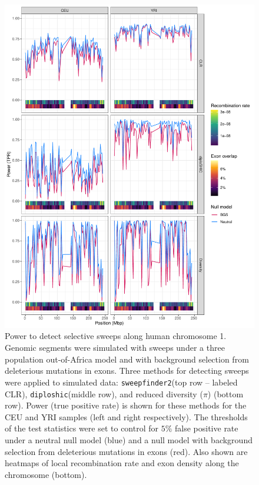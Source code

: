 \documentclass[hidelinks]{article}
\newcommand{\sweepfinder}{\texttt{sweepfinder2}\xspace}
\newcommand{\diploshic}{\texttt{diploshic}\xspace}
\begin{document}
    \begin{figure}[b!]
        \centering
        \includegraphics[width=0.8 \textwidth]{figures/sweeps/chr1_power.pdf}
        \caption{
        Power to detect selective sweeps along human
        chromosome 1. Genomic segments were simulated with sweeps under a three population out-of-Africa model
        and with background selection from deleterious mutations in exons.
        Three methods for detecting sweeps were applied to simulated data:
        \sweepfinder (top row -- labeled CLR),
        \diploshic (middle row),
        and reduced diversity ($\pi$) (bottom row).
        Power (true positive rate) is shown for these methods for the CEU and YRI
        samples (left and right respectively).
        The thresholds of the test statistics were set to control for
        $5\%$ false positive rate under a neutral null model (blue)
        and a null model with background selection from deleterious mutations in exons (red).
        Also shown are heatmaps of local recombination rate and exon density along the
        chromosome (bottom).
        }
        \label{fig:chr1_power}
    \end{figure}
\end{document}

